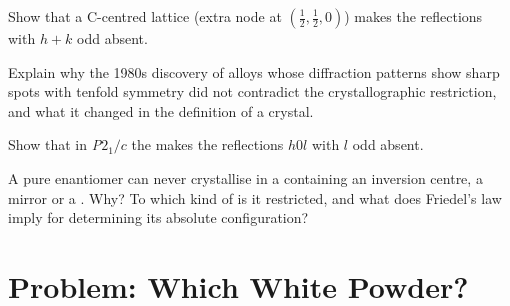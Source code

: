 \begin{exercise}[$\star\star$]\label{exo:b3:x-ray-diffraction:9}
Show that a C-centred lattice (extra node at $(\frac12,\frac12,0)$) makes the
reflections with $h + k$ odd absent.
\end{exercise}

\begin{exercise}[$\star\star\star$]\label{exo:b3:x-ray-diffraction:10}
Explain why the 1980s discovery of alloys whose diffraction patterns show sharp
spots with tenfold symmetry did not contradict the crystallographic
restriction, and what it changed in the definition of a crystal.
\end{exercise}

\begin{exercise}[$\star\star\star$]\label{exo:b3:x-ray-diffraction:11}
Show that in \textit{P}$2_1/c$ the  makes the reflections $h0l$ with $l$
odd absent.
\end{exercise}

\begin{exercise}[$\star\star\star$]\label{exo:b3:x-ray-diffraction:12}
A pure enantiomer can never crystallise in a  containing an
inversion centre, a mirror or a . Why? To which kind of  is
it restricted, and what does Friedel's law imply for determining its absolute
configuration?
\end{exercise}

\clearpage
\enlargethispage{3\baselineskip}
\section{Problem: Which White Powder?}

